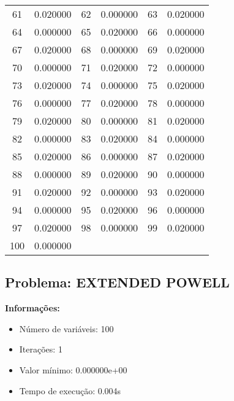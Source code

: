 \documentclass[12pt]{article}
\begin{document}
\begin{longtable}{@{}cc|cc|cc@{}}
61 & 0.020000 & 62 & 0.000000 & 63 & 0.020000 \\
64 & 0.000000 & 65 & 0.020000 & 66 & 0.000000 \\
67 & 0.020000 & 68 & 0.000000 & 69 & 0.020000 \\
70 & 0.000000 & 71 & 0.020000 & 72 & 0.000000 \\
73 & 0.020000 & 74 & 0.000000 & 75 & 0.020000 \\
76 & 0.000000 & 77 & 0.020000 & 78 & 0.000000 \\
79 & 0.020000 & 80 & 0.000000 & 81 & 0.020000 \\
82 & 0.000000 & 83 & 0.020000 & 84 & 0.000000 \\
85 & 0.020000 & 86 & 0.000000 & 87 & 0.020000 \\
88 & 0.000000 & 89 & 0.020000 & 90 & 0.000000 \\
91 & 0.020000 & 92 & 0.000000 & 93 & 0.020000 \\
94 & 0.000000 & 95 & 0.020000 & 96 & 0.000000 \\
97 & 0.020000 & 98 & 0.000000 & 99 & 0.020000 \\
100 & 0.000000 &  &  &  &  \\

\end{longtable}


\newpage            
\subsection{Problema: EXTENDED POWELL}

\textbf{Informações:}
\begin{itemize}
\item Número de variáveis: 100
\item Iterações: 1
\item Valor mínimo: 0.000000e+00
\item Tempo de execução: 0.004s
\end{itemize}
\end{document}
